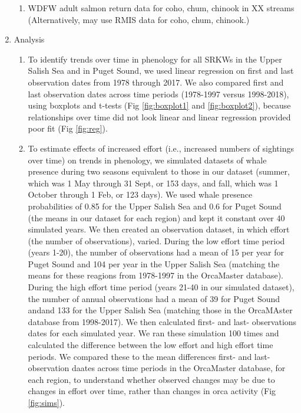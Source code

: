 \documentclass{article}
\begin{document}
\begin{enumerate}
\begin{enumerate}
\item WDFW adult salmon return data for coho, chum, chinook in XX streams (Alternatively, may use RMIS data for coho, chum, chinook.)
\end{enumerate}
\item Analysis
\begin{enumerate}
\item To identify trends over time in phenology for all SRKWs in the Upper Salish Sea and in Puget Sound, we used linear regression on first  and last observation dates from 1978 through 2017. We also compared first and last observation dates across time periods (1978-1997 versus 1998-2018), using boxplots and t-tests (Fig \ref{fig:boxplot1} and \ref{fig:boxplot2}), because relationships over time did not look linear and linear regression provided poor fit (Fig \ref{fig:reg}). 
\item To estimate effects of increased effort (i.e., increased numbers of sightings over time) on trends in phenology, we simulated datasets of whale presence during two seasons equivalent to those in our dataset (summer, which was 1 May through 31 Sept, or 153 days, and fall, which was 1 October through 1 Feb, or 123 days). We used whale presence probabilities of 0.85 for the Upper Salish Sea and 0.6 for Puget Sound (the means in our dataset for each region) and kept it constant over 40 simulated years. We then created an observation dataset, in which effort (the number of observations), varied. During the low effort time period (years 1-20), the number of observations had a mean of 15 per year for Puget Sound and 104 per year in the Upper Salish Sea (matching the means for these reagions from 1978-1997 in the OrcaMaster database).  During the high effort time period (years 21-40 in our simulated dataset), the number of annual observations had a mean of 39 for Puget Sound andand 133 for the Upper Salish Sea (matching those in the OrcaMAster database from 1998-2017). We then calculated first- and last- observations dates for each simulated year. We ran these simulation 100 times and calculated the difference between the low effort and high effort time periods. We compared these to the mean differences first- and last-observation daates across time periods in the OrcaMaster database, for each region, to understand whether observed changes may be due to changes in effort over time, rather than changes in orca activity (Fig \ref{fig:sims}).


\end{enumerate}
\end{enumerate}
\end{document}
